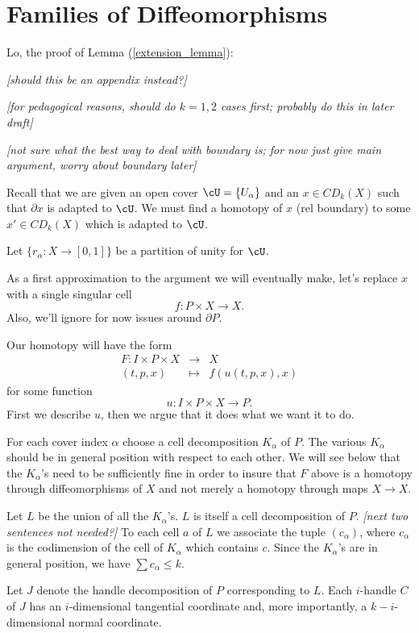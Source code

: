 \documentclass[11pt,leqno]{amsart}
\def\bd{\partial}
\def\nn#1{{{\it \small [#1]}}}
\newcommand{\eq}[1]{\begin{displaymath}#1\end{displaymath}}
\newcommand{\eqar}[1]{\begin{eqnarray*}#1\end{eqnarray*}}
\begin{document}
\appendix

\section{Families of Diffeomorphisms}  \label{sec:localising}


Lo, the proof of Lemma (\ref{extension_lemma}):

\nn{should this be an appendix instead?}

\nn{for pedagogical reasons, should do $k=1,2$ cases first; probably do this in
later draft}

\nn{not sure what the best way to deal with boundary is; for now just give main argument, worry
about boundary later}

Recall that we are given
an open cover $\cU = \{U_\alpha\}$ and an
$x \in CD_k(X)$ such that $\bd x$ is adapted to $\cU$.
We must find a homotopy of $x$ (rel boundary) to some $x' \in CD_k(X)$ which is adapted to $\cU$.

Let $\{r_\alpha : X \to [0,1]\}$ be a partition of unity for $\cU$.

As a first approximation to the argument we will eventually make, let's replace $x$
with a single singular cell
\eq{
    f: P \times X \to X .
}
Also, we'll ignore for now issues around $\bd P$.

Our homotopy will have the form
\eqar{
    F: I \times P \times X &\to& X \\
    (t, p, x) &\mapsto& f(u(t, p, x), x)
}
for some function
\eq{
    u : I \times P \times X \to P .
}
First we describe $u$, then we argue that it does what we want it to do.

For each cover index $\alpha$ choose a cell decomposition $K_\alpha$ of $P$.
The various $K_\alpha$ should be in general position with respect to each other.
We will see below that the $K_\alpha$'s need to be sufficiently fine in order
to insure that $F$ above is a homotopy through diffeomorphisms of $X$ and not
merely a homotopy through maps $X\to X$.

Let $L$ be the union of all the $K_\alpha$'s.
$L$ is itself a cell decomposition of $P$.
\nn{next two sentences not needed?}
To each cell $a$ of $L$ we associate the tuple $(c_\alpha)$,
where $c_\alpha$ is the codimension of the cell of $K_\alpha$ which contains $c$.
Since the $K_\alpha$'s are in general position, we have $\sum c_\alpha \le k$.

Let $J$ denote the handle decomposition of $P$ corresponding to $L$.
Each $i$-handle $C$ of $J$ has an $i$-dimensional tangential coordinate and,
more importantly, a $k{-}i$-dimensional normal coordinate.
\end{document}
